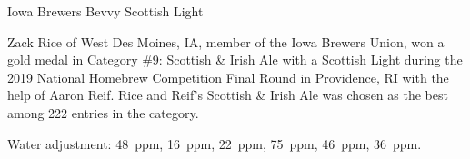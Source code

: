 \stylesection{\stylescottishlight}

\begin{recipie}{Iowa Brewers Bevvy Scottish Light}

\begin{aboutblock}
Zack Rice of West Des Moines, IA, member of the Iowa Brewers Union, won a gold
medal in Category \#9: Scottish \& Irish Ale with a Scottish Light during the
2019 National Homebrew Competition Final Round in Providence, RI with the help
of Aaron Reif. Rice and Reif's Scottish \& Irish Ale was chosen as the best among
222 entries in the category.
\end{aboutblock}


\begin{methodandtiming}
 
\begin{mashsteps}
\end{mashsteps}

\begin{fermentationsteps}
\end{fermentationsteps}

\begin{directions}
Water adjustment:  48~ppm,  16~ppm,  22~ppm,  75~ppm,
 46~ppm,  36~ppm.
\end{directions}

\end{methodandtiming}

\pagebreak

\begin{ingredientsblock}

\begin{malts}
\end{malts}

\begin{hops}
\end{hops}

\begin{yeasts}
\end{yeasts}

\end{ingredientsblock}

\end{recipie}
